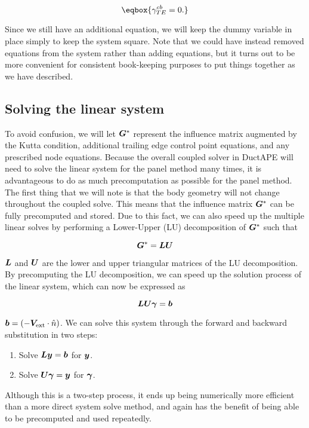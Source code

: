 \begin{equation}
    \eqbox{
    \gamma_{TE}^{cb} = 0.
}
\end{equation}

\noindent Since we still have an additional equation, we will keep the dummy variable in place simply to keep the system square.
%
Note that we could have instead removed equations from the system rather than adding equations, but it turns out to be more convenient for consistent book-keeping purposes to put things together as we have described.


\subsection{Solving the linear system}

To avoid confusion, we will let \(\bm{G}^*\) represent the influence matrix augmented by the Kutta condition, additional trailing edge control point equations, and any prescribed node equations.
%
Because the overall coupled solver in DuctAPE will need to solve the linear system for the panel method many times, it is advantageous to do as much precomputation as possible for the panel method.
%
The first thing that we will note is that the body geometry will not change throughout the coupled solve.
%
This means that the influence matrix \(\bm{G}^*\) can be fully precomputed and stored.
%
Due to this fact, we can also speed up the multiple linear solves by performing a Lower-Upper (LU) decomposition of \(\bm{G}^*\) such that

\begin{equation}
    \bm{G}^* = \bm{LU}
\end{equation}

\where \(\bm{L}\) and \(\bm{U}\) are the lower and upper triangular matrices of the LU decomposition.
%
By precomputing the LU decomposition, we can speed up the solution process of the linear system, which can now be expressed as

\begin{equation}
    \bm{LU}\bm{\gamma} = \bm{b}
\end{equation}

\where \(\bm{b}=\left(-\bm{V}_\text{ext} \cdot \hat{n}\right)\).
%
We can solve this system through the forward and backward substitution in two steps:
\begin{enumerate}
    \item Solve \(\bm{L}\bm{y} = \bm{b}\) for \(\bm{y}\).
    \item Solve \(\bm{U}\bm{\gamma} = \bm{y}\) for \(\bm{\gamma}\).
\end{enumerate}
%
Although this is a two-step process, it ends up being numerically more efficient than a more direct system solve method, and again has the benefit of being able to be precomputed and used repeatedly.


